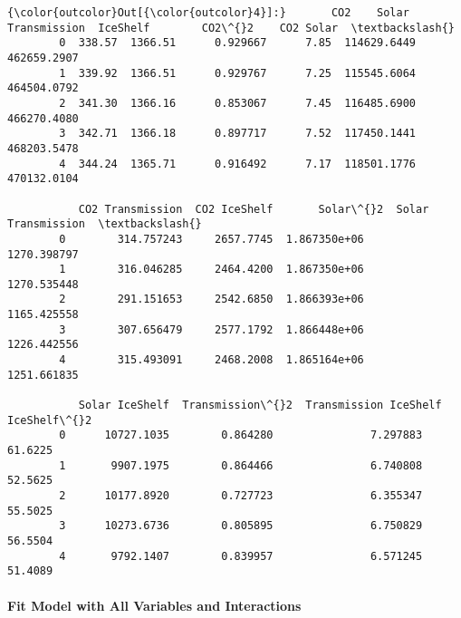 \documentclass[11pt]{article}
\begin{document}
\begin{Verbatim}[commandchars=\\\{\}]
{\color{outcolor}Out[{\color{outcolor}4}]:}       CO2    Solar  Transmission  IceShelf        CO2\^{}2    CO2 Solar  \textbackslash{}
        0  338.57  1366.51      0.929667      7.85  114629.6449  462659.2907   
        1  339.92  1366.51      0.929767      7.25  115545.6064  464504.0792   
        2  341.30  1366.16      0.853067      7.45  116485.6900  466270.4080   
        3  342.71  1366.18      0.897717      7.52  117450.1441  468203.5478   
        4  344.24  1365.71      0.916492      7.17  118501.1776  470132.0104   
        
           CO2 Transmission  CO2 IceShelf       Solar\^{}2  Solar Transmission  \textbackslash{}
        0        314.757243     2657.7745  1.867350e+06         1270.398797   
        1        316.046285     2464.4200  1.867350e+06         1270.535448   
        2        291.151653     2542.6850  1.866393e+06         1165.425558   
        3        307.656479     2577.1792  1.866448e+06         1226.442556   
        4        315.493091     2468.2008  1.865164e+06         1251.661835   
        
           Solar IceShelf  Transmission\^{}2  Transmission IceShelf  IceShelf\^{}2  
        0      10727.1035        0.864280               7.297883     61.6225  
        1       9907.1975        0.864466               6.740808     52.5625  
        2      10177.8920        0.727723               6.355347     55.5025  
        3      10273.6736        0.805895               6.750829     56.5504  
        4       9792.1407        0.839957               6.571245     51.4089  
\end{Verbatim}
            
    \paragraph{Fit Model with All Variables and
Interactions}\label{fit-model-with-all-variables-and-interactions}
\end{document}
